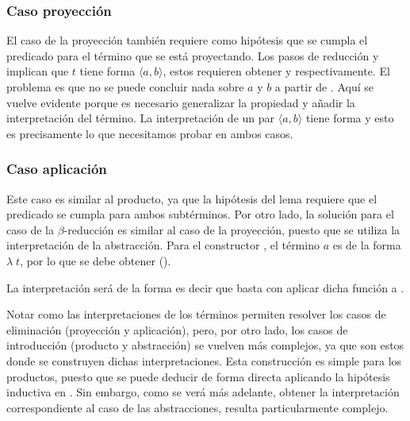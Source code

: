 \subsubsection{Caso proyección}

El caso de la proyección también requiere como hipótesis que se cumpla el predicado para el término que se está proyectando.
Los pasos de reducción  y  implican que $t$ tiene forma $\langle a, b \rangle$, estos requieren obtener \snstar {} y \snstar {} respectivamente.
El problema es que no se puede concluir nada sobre $a$ y $b$ a partir de .
Aquí se vuelve evidente porque es necesario generalizar la propiedad  y añadir la interpretación del término.
La interpretación de un par $\langle a, b \rangle$ tiene forma \snstar{}  \snstar{} y esto es precisamente lo que necesitamos probar en ambos casos.


\subsubsection{Caso aplicación}

Este caso es similar al producto, ya que la hipótesis del lema requiere que el predicado se cumpla para ambos subtérminos.
Por otro lado, la solución para el caso de la $\beta$-reducción es similar al caso de la proyección, puesto que se utiliza la interpretación de la abstracción.
Para el constructor , el término $a$ es de la forma $\lambda\; t$, por lo que se debe obtener
\snstar(\func{[}\func{]}).


La interpretación  será de la forma
\snstar{}
\snstar{}
es decir que basta con aplicar dicha función a .

Notar como las interpretaciones de los términos permiten resolver los casos de eliminación (proyección y aplicación), pero, por otro lado, los casos de introducción (producto y abstracción) se vuelven más complejos, ya que son estos donde se construyen dichas interpretaciones.
Esta construcción es simple para los productos, puesto que se puede deducir de forma directa aplicando la hipótesis inductiva en .	
Sin embargo, como se verá más adelante, obtener la interpretación correspondiente al caso de las abstracciones, resulta particularmente complejo.

